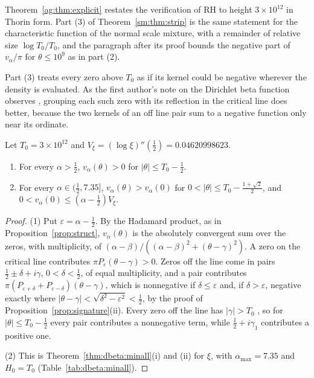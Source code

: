 Theorem~\ref{ag:thm:explicit} restates the verification of RH to height $3\times10^{12}$ in Thorin form. Part (3) of Theorem~\ref{sm:thm:strip} is the same statement for the characteristic function of the normal scale mixture, with a remainder of relative size $\log T_0/T_0$, and the paragraph after its proof bounds the negative part of $v_\alpha/\pi$ for $\theta\le10^9$ as in part (2).

Part (3) treats every zero above $T_0$ as if its kernel could be negative wherever the density is evaluated. As the first author's note on the Dirichlet beta function observes \cite{P26beta}, grouping each such zero with its reflection in the critical line does better, because the two kernels of an off line pair sum to a negative function only near its ordinate.

\begin{corollary}\label{cor:dbeta:window}
Let $T_0=3\times10^{12}$ and $V_\xi=(\log\xi)''(\frac12)=0.04620998623$.
\begin{enumerate}
\item For every $\alpha>\frac12$, $v_\alpha(\theta)>0$ for $|\theta|\le T_0-\frac12$.
\item For every $\alpha\in(\frac12,7.35]$, $v_\alpha(\theta)>v_\alpha(0)$ for $0<|\theta|\le T_0-\frac{1+\sqrt2}2$, and $0<v_\alpha(0)\le(\alpha-\frac12)V_\xi$.
\end{enumerate}
\end{corollary}

\begin{proof}
(1) Put $\varepsilon=\alpha-\frac12$. By the Hadamard product, as in Proposition~\ref{prop:struct}, $v_\alpha(\theta)$ is the absolutely convergent sum over the zeros, with multiplicity, of $(\alpha-\beta)/((\alpha-\beta)^2+(\theta-\gamma)^2)$. A zero on the critical line contributes $\pi P_\varepsilon(\theta-\gamma)>0$. Zeros off the line come in pairs $\frac12\pm\delta+i\gamma$, $0<\delta<\frac12$, of equal multiplicity, and a pair contributes $\pi(P_{\varepsilon+\delta}+P_{\varepsilon-\delta})(\theta-\gamma)$, which is nonnegative if $\delta\le\varepsilon$ and, if $\delta>\varepsilon$, negative exactly where $|\theta-\gamma|<\sqrt{\delta^2-\varepsilon^2}<\frac12$, by the proof of Proposition~\ref{prop:signature}(ii). Every zero off the line has $|\gamma|>T_0$ \cite{PT21}, so for $|\theta|\le T_0-\frac12$ every pair contributes a nonnegative term, while $\frac12+i\gamma_1$ contributes a positive one.

(2) This is Theorem~\ref{thm:dbeta:minall}(i) and (ii) for $\xi$, with $\alpha_{\max}=7.35$ and $H_0=T_0$ (Table~\ref{tab:dbeta:minall}).
\end{proof}

